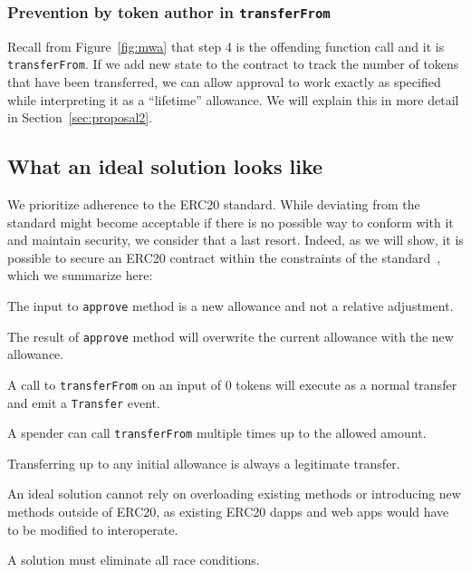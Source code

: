 \subsubsection*{Prevention by token author in \texttt{transferFrom}} Recall from Figure~\ref{fig:mwa} that step 4 is the offending function call and it is \texttt{transferFrom}. If we add new state to the contract to track the number of tokens that have been transferred, we can allow approval to work exactly as specified while interpreting it as a ``lifetime'' allowance. We will explain this in more detail in Section~\ref{sec:proposal2}. 

\subsection{What an ideal solution looks like}\label{sec:criteria}
We prioritize adherence to the ERC20 standard. While deviating from the standard might become acceptable if there is no possible way to conform with it and maintain security, we consider that a last resort. Indeed, as we will show, it is possible to secure an ERC20 contract within the constraints of the standard~\cite{Ref08}, which we summarize here:

\begin{compactlistn}
\item The input to \texttt{approve} method is a new allowance and not a relative adjustment.
\item The result of \texttt{approve} method will overwrite the current allowance with the new allowance.
\item A call to \texttt{transferFrom} on an input of 0 tokens will execute as a normal transfer and emit a \texttt{Transfer} event.
\item A spender can call \texttt{transferFrom} multiple times up to the allowed amount.
\item Transferring up to any initial allowance is always a legitimate transfer.
\item An ideal solution cannot rely on overloading existing methods or introducing new methods outside of ERC20, as existing ERC20 dapps and web apps would have to be modified to interoperate.
\item A solution must eliminate all race conditions.
\end{compactlistn}